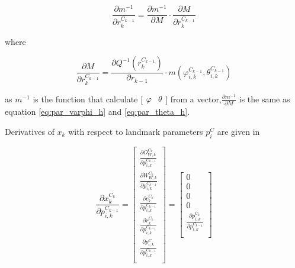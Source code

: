 \begin{equation}
\frac{\partial m^{-1}}{\partial r_{k}^{C_{k-1}}}=
\frac{\partial m^{-1}}{\partial M}\cdot 
\frac{\partial M}{\partial r_{k}^{C_{k-1}}}
\end{equation}

\noindent where

\begin{equation}
\frac{\partial M}{\partial r_{k}^{C_{k-1}}}= 
\frac{\partial Q^{-1}(r_{k}^{C_{k-1}})}{\partial r_{k-1}}
\cdot m(\varphi_{i, k}^{C_{k-1}}, \theta_{i, k}^{C_{k-1}})
\end{equation}


\noindent as $m^{-1}$ is the function that calculate
$\lbrack\begin{matrix}\varphi & \theta \end{matrix}\rbrack$ from a
vector,$\frac{\partial m^{-1}}{\partial M}$ is the same as equation
\ref{eq:par_varphi_h} and \ref{eq:par_theta_h}.

Derivatives of $x_{k}$ with respect to landmark parameters $p_{i}^{C}$
are given in

\begin{equation}
\frac{\partial x_{k}^{C_{k}}}{\partial p_{i,k}^{C_{k-1 }}}=
\begin{bmatrix}
\frac{\partial O_{W,k}^{C_{k}}}{\partial p_{i,k}^{C_{k-1 }}} \\
\frac{\partial W_{W,k}^{C_{k}}}{\partial p_{i,k}^{C_{k-1 }}} \\
\frac{\partial c_{k}^{C_{k}}}{\partial p_{i,k}^{C_{k-1 }}} \\
\frac{\partial r_{k}^{C_{k}}}{\partial p_{i,k}^{C_{k-1 }}} \\
\frac{\partial p_{i, k}^{C}}{\partial p_{i,k}^{C_{k-1 }}} \\
\end{bmatrix} = \begin{bmatrix}
0 \\
0 \\
0 \\
0 \\
\frac{\partial p_{i,k}^{C_{k }}}{\partial p_{i,k}^{C_{k-1 }}} \\
\end{bmatrix}
\end{equation}

